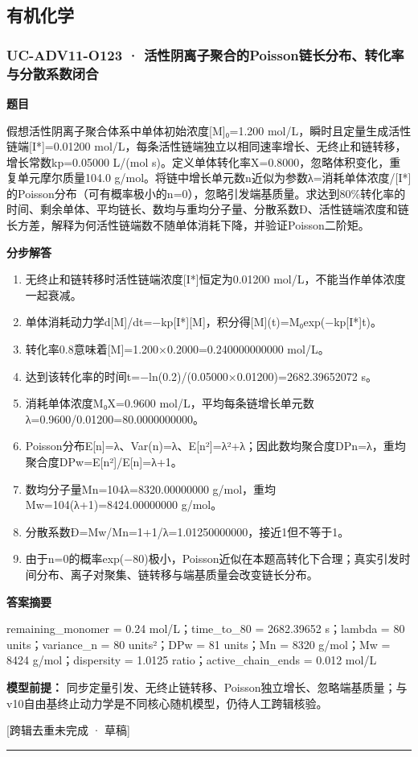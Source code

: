 \documentclass[UTF8,11pt,a4paper]{ctexart}
\begin{document}
\subsection*{有机化学}
\subsubsection*{UC-ADV11-O123 · 活性阴离子聚合的Poisson链长分布、转化率与分散系数闭合}
\noindent\textbf{题目}\par
假想活性阴离子聚合体系中单体初始浓度[M]₀=1.200 mol/L，瞬时且定量生成活性链端[I*]=0.01200 mol/L，每条活性链端独立以相同速率增长、无终止和链转移，增长常数kp=0.05000 L/(mol s)。定义单体转化率X=0.8000，忽略体积变化，重复单元摩尔质量104.0 g/mol。将链中增长单元数n近似为参数λ=消耗单体浓度/[I*]的Poisson分布（可有概率极小的n=0），忽略引发端基质量。求达到80\%转化率的时间、剩余单体、平均链长、数均与重均分子量、分散系数Đ、活性链端浓度和链长方差，解释为何活性链端数不随单体消耗下降，并验证Poisson二阶矩。\par
\medskip\noindent\textbf{分步解答}
\begin{enumerate}
\item 无终止和链转移时活性链端浓度[I*]恒定为0.01200 mol/L，不能当作单体浓度一起衰减。
\item 单体消耗动力学d[M]/dt=−kp[I*][M]，积分得[M](t)=M₀exp(−kp[I*]t)。
\item 转化率0.8意味着[M]=1.200×0.2000=0.240000000000 mol/L。
\item 达到该转化率的时间t=−ln(0.2)/(0.05000×0.01200)=2682.39652072 s。
\item 消耗单体浓度M₀X=0.9600 mol/L，平均每条链增长单元数λ=0.9600/0.01200=80.0000000000。
\item Poisson分布E[n]=λ、Var(n)=λ、E[n²]=λ²+λ；因此数均聚合度DPn=λ，重均聚合度DPw=E[n²]/E[n]=λ+1。
\item 数均分子量Mn=104λ=8320.00000000 g/mol，重均Mw=104(λ+1)=8424.00000000 g/mol。
\item 分散系数Đ=Mw/Mn=1+1/λ=1.01250000000，接近1但不等于1。
\item 由于n=0的概率exp(−80)极小，Poisson近似在本题高转化下合理；真实引发时间分布、离子对聚集、链转移与端基质量会改变链长分布。
\end{enumerate}
\noindent\textbf{答案摘要}\par
remaining\_monomer = 0.24 mol/L；time\_to\_80 = 2682.39652 s；lambda = 80 units；variance\_n = 80 units²；DPw = 81 units；Mn = 8320 g/mol；Mw = 8424 g/mol；dispersity = 1.0125 ratio；active\_chain\_ends = 0.012 mol/L\par
\noindent\textbf{模型前提：}
同步定量引发、无终止链转移、Poisson独立增长、忽略端基质量；与v10自由基终止动力学是不同核心随机模型，仍待人工跨辑核验。\par
\noindent\textcolor{red!65!black}{[跨辑去重未完成 · 草稿]} \par
\medskip\hrule\medskip
{}
\end{document}
